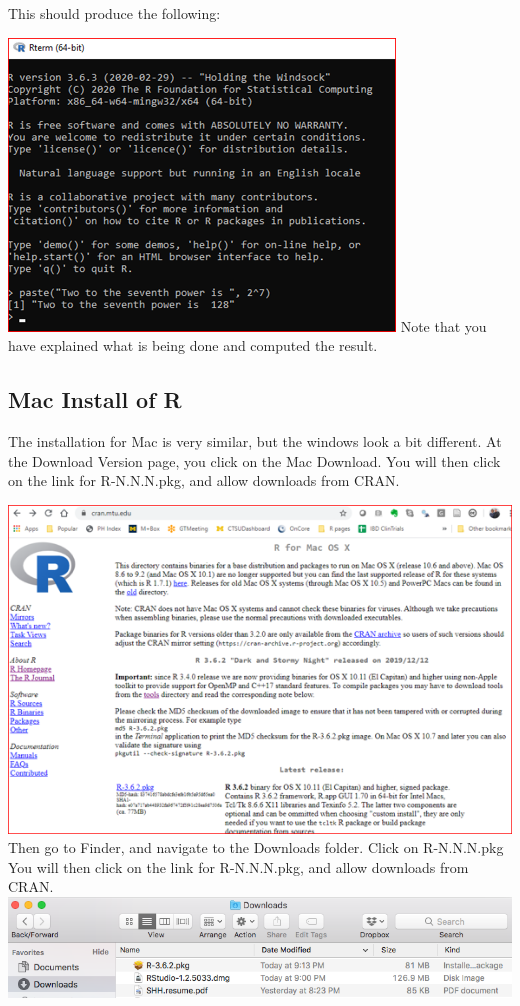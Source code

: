 \documentclass[
]{book}
\begin{document}
This should produce the following:

\includegraphics{images/windowstest.png}
Note that you have explained what is being done and computed the result.

\hypertarget{mac-install-of-r}{%
\subsection{Mac Install of R}\label{mac-install-of-r}}

The installation for Mac is very similar, but the windows look a bit different. At the Download Version page, you click on the Mac Download.
You will then click on the link for R-N.N.N.pkg, and allow downloads from CRAN.

\includegraphics{images/installrpkgmac.png}
Then go to Finder, and navigate to the Downloads folder. Click on R-N.N.N.pkg
You will then click on the link for R-N.N.N.pkg, and allow downloads from CRAN.
\includegraphics{images/installrdownloadsmac.png}
\end{document}
